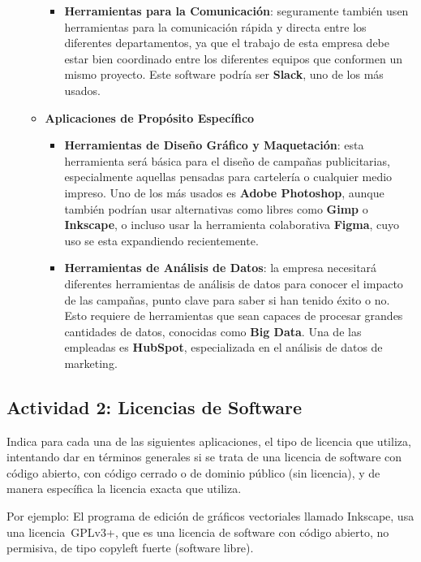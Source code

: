 \begin{itemize}
\begin{itemize}
\begin{itemize}
            \item \textbf{Herramientas para la Comunicación}: seguramente también usen herramientas para la comunicación rápida y directa entre los diferentes departamentos, ya que el trabajo de esta empresa debe estar bien coordinado entre los diferentes equipos que conformen un mismo proyecto. Este software podría ser \textbf{Slack}, uno de los más usados.
        \end{itemize}

        \item \textbf{Aplicaciones de Propósito Específico}
        \begin{itemize}
            \item \textbf{Herramientas de Diseño Gráfico y Maquetación}: esta herramienta será básica para el diseño de campañas publicitarias, especialmente aquellas pensadas para cartelería o cualquier medio impreso. Uno de los más usados es \textbf{Adobe Photoshop}, aunque también podrían usar alternativas como libres como \textbf{Gimp} o \textbf{Inkscape}, o incluso usar la herramienta colaborativa \textbf{Figma}, cuyo uso se esta expandiendo recientemente.

            \item \textbf{Herramientas de Análisis de Datos}: la empresa necesitará diferentes herramientas de análisis de datos para conocer el impacto de las campañas, punto clave para saber si han tenido éxito o no. Esto requiere de herramientas que sean capaces de procesar grandes cantidades de datos, conocidas como \textbf{Big Data}. Una de las empleadas es \textbf{HubSpot}, especializada en el análisis de datos de marketing.
        \end{itemize}
    \end{itemize}
\end{itemize}

\subsection{Actividad 2: Licencias de Software}
Indica para cada una de las siguientes aplicaciones, el tipo de licencia que utiliza, intentando dar en términos generales si se trata de una licencia de software con código abierto, con código cerrado o de dominio público (sin licencia), y de manera específica la licencia exacta que utiliza.

Por ejemplo: El programa de edición de gráficos vectoriales llamado Inkscape, usa una licencia GPLv3+, que es una licencia de software con código abierto, no permisiva, de tipo copyleft fuerte (software libre).

